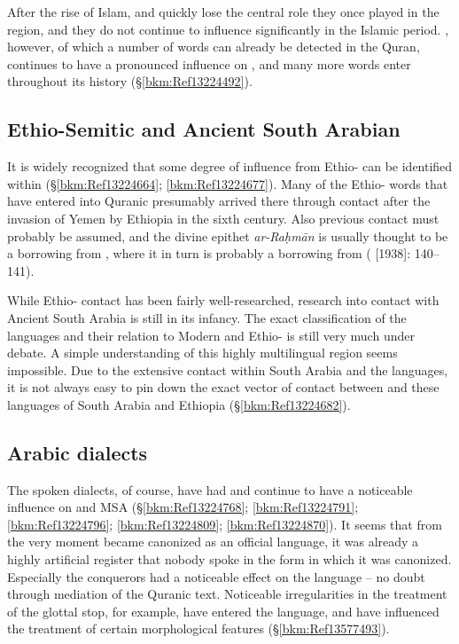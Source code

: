 \documentclass[output=paper]{langsci/langscibook}
\begin{document}
After the rise of Islam,  and  quickly lose the central role they once played in the region, and they do not continue to influence  significantly in the Islamic period. , however, of which a number of words can already be detected in the {Quran}, continues to have a pronounced influence on , and many more  words enter  throughout its history (§\ref{bkm:Ref13224492}).

\subsection{Ethio-Semitic and Ancient South Arabian}

It is widely recognized that some degree of influence from Ethio- can be identified within  (§\ref{bkm:Ref13224664}; \ref{bkm:Ref13224677}). Many of the Ethio- words that have entered into Quranic  presumably arrived there through  contact after the invasion of {Yemen} by  Ethiopia in the sixth century. Also previous  contact must probably be assumed, and the divine epithet \textit{ar-Raḥmān} is usually thought to be a borrowing from , where it in turn is probably a borrowing from  (\citealt{Jeffrey2007} [1938]: 140--141). 

While Ethio- contact has been fairly well-researched, research into contact with Ancient South Arabia is still in its infancy. The exact classification of the  languages and their relation to Modern  and Ethio- is still very much under debate. A simple understanding of this highly multilingual region seems impossible. Due to the extensive contact within South Arabia and the  languages, it is not always easy to pin down the exact vector of contact between  and these languages of South Arabia and Ethiopia (§\ref{bkm:Ref13224682}).

\subsection{\label{bkm:Ref13224768}Arabic dialects}

The spoken  dialects, of course, have had and continue to have a noticeable influence on  and MSA (§\ref{bkm:Ref13224768}; \ref{bkm:Ref13224791}; \ref{bkm:Ref13224796}; \ref{bkm:Ref13224809}; \ref{bkm:Ref13224870}). It seems that from the very moment  became canonized as an official language, it was already a highly artificial {register} that nobody spoke in the form in which it was canonized. Especially the  conquerors had a noticeable effect on the language – no doubt through mediation of the Quranic text. Noticeable irregularities in the treatment of the glottal stop, for example, have entered the language, and have influenced the treatment of certain morphological features (§\ref{bkm:Ref13577493}).
\end{document}
